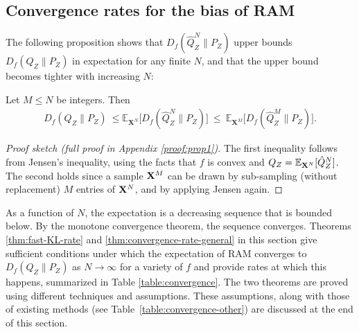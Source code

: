 \subsection{Convergence rates for the bias of RAM}
The following proposition shows that $D_f(\hat{Q}_Z^N \| P_Z)$ upper bounds $D_f(Q_{Z} \| P_Z)$ in expectation for any finite $N$, and that the upper bound becomes tighter with increasing $N$:
%
\begin{proposition}\label{prop:upper-bound}
Let $M \leq N$ be integers. Then
\begin{align}
\label{eq:our-estimate}
    D_f(Q_Z \| P_Z) \ \leq 
    \mathbb{E}_{\mathbf{X}^N} \bigl[D_f(\hat{Q}_Z^N \| P_Z)\bigr] \  \leq \ \mathbb{E}_{\mathbf{X}^M} \bigl[D_f(\hat{Q}_Z^M \| P_Z)\bigr].
\end{align}
\end{proposition}
\begin{proof}[Proof sketch (full proof in Appendix \ref{proof:prop1})]
The first inequality follows from Jensen's inequality, using the facts that $f$ is convex and ${Q_Z = \mathbb{E}_{\mathbf{X}^N} [\hat{Q}_Z^N}]$.
The second holds since a sample ${\mathbf{X}^M}$ can be drawn by sub-sampling (without replacement) $M$ entries of ${\mathbf{X}^N}$, and by applying Jensen again.
\end{proof}
As a function of $N$, the expectation is a decreasing sequence that is bounded below.
By the monotone convergence theorem, the sequence converges.
Theorems \ref{thm:fast-KL-rate} and \ref{thm:convergence-rate-general} in this section give sufficient conditions under which the expectation of RAM converges to $D_f(Q_{Z} \| P_Z)$ as $N\to\infty$ for a variety of $f$ and provide rates at which this happens, summarized in Table \ref{table:convergence}.
The two theorems are proved using different techniques and assumptions. 
These assumptions, along with those of existing methods (see Table~\ref{table:convergence-other}) are discussed at the end of this section.

